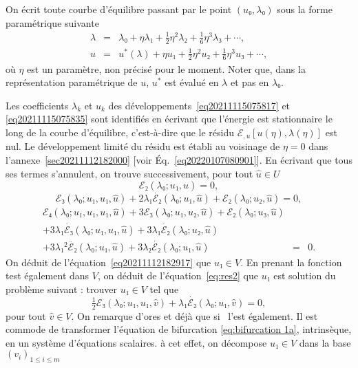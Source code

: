 \documentclass[12pt, final]{amsart}
\theoremstyle{definition}
\begin{document}
On écrit toute courbe d'équilibre passant par le point \((u₀, λ₀)\) sous la forme paramétrique suivante
\begin{eqnarray}
 λ & = & λ₀ + η λ₁ + \tfrac{1}{2} η^2 λ₂ +
 \tfrac{1}{6} η^3 λ₃ + \cdots, \label{eq20211115075817}\\
 u & = & u^{\ast}(λ) + η u₁ + \tfrac{1}{2} η^2 u₂ +
 \tfrac{1}{6} η^3 u₃ + \cdots, \label{eq20211115075835}
\end{eqnarray}
où \(η\) est un paramètre, non précisé pour le moment. Noter que, dans la représentation paramétrique de \(u\), \(u^{\ast}\) est évalué en \(λ\) et pas en \(λ₀\).

Les coefficients \(λ_k\) et \(u_k\) des développements~\eqref{eq20211115075817} et \eqref{eq20211115075835} sont identifiés en écrivant que l'énergie est stationnaire le long de la courbe d'équilibre, c'est-à-dire que le résidu \(ℰ_{, u} [u(η), λ(η)]\) est nul. Le développement limité du résidu est établi au voisinage de \(η = 0\) dans l'annexe~\ref{sec20211112182000} [voir Éq.~\eqref{eq20220107080901}]. En écrivant que tous ses termes s'annulent, on trouve successivement, pour tout \(\hat{u}∈U\)
\begin{equation}
 \label{eq20211112182917} ℰ₂(λ₀ ; u₁, \hat{u}) = 0,
\end{equation}
\begin{equation}
 \label{eq:res2} ℰ₃(λ₀ ; u₁, u₁, \hat{u}) + 2 λ₁
 \dot{ℰ₂}(λ₀ ; u₁, \hat{u}) +ℰ₂(λ₀ ;
 u₂, \hat{u}) = 0,
\end{equation}
\begin{eqnarray}
 ℰ₄(λ₀ ; u₁, u₁, u₁, \hat{u}) + 3ℰ₃
 (λ₀ ; u₁, u₂, \hat{u}) +ℰ₂(λ₀ ; u₃, \hat{u}) &
 & \nonumber\\
 + 3 λ₁ \dot{ℰ₃}(λ₀ ; u₁, u₁, \hat{u}) + 3
 λ₁ \dot{ℰ₂}(λ₀ ; u₂, \hat{u}) & & \nonumber\\
 + 3 λ₁^2 \ddot{ℰ₂}(λ₀ ; u₁, \hat{u}) + 3
 λ₂ \dot{ℰ₂}(λ₀ ; u₁, \hat{u}) & = & 0.
 \label{eq:res3}
\end{eqnarray}
On déduit de l'équation~\eqref{eq20211112182917} que \(u₁∈V\). En prenant la fonction test également dans \(V\), on déduit de l'équation~\eqref{eq:res2} que \(u₁\) est solution du problème suivant : trouver \(u₁∈V\) tel que
\begin{equation}
 \label{eq:bifurcation 1a} \tfrac{1}{2} ℰ₃(λ₀ ; u₁, u₁,
 \hat{v}) + λ₁ \dot{ℰ₂}(λ₀ ; u₁, \hat{v}) = 0,
\end{equation}
pour tout \(\hat{v}∈V\). On remarque d'ores et déjà que si \ l'est également. Il est commode de transformer l'équation de bifurcation \eqref{eq:bifurcation 1a}, intrinsèque, en un système d'équations scalaires. à cet effet, on décompose \(u₁∈V\) dans la base \((v_i)_{1 \leqslant i \leqslant m}\)
\end{document}
